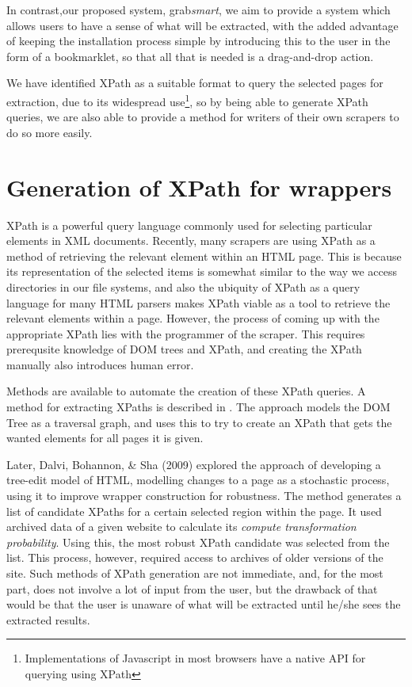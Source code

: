 In contrast,our proposed system, grab\textit{smart}, we aim to provide a system which allows users to have a
sense of what will be extracted, with the added advantage of keeping the installation process
simple by introducing this to the user in the form of a bookmarklet, so that all that is needed
is a drag-and-drop action.

We have identified XPath as a suitable format to query the selected pages for extraction,
due to its widespread use\footnote{Implementations of Javascript in most browsers have
a native API for querying using XPath}, so by being able to generate XPath queries,
we are also able to provide a method for writers of their own scrapers to do so more easily.


\section{Generation of XPath for wrappers}
XPath is a powerful query language commonly used for selecting particular elements in XML
documents. Recently, many scrapers are using XPath as a method of retrieving the relevant
element within an HTML page. This is because its representation of the selected items is
somewhat similar to the way we access directories in our file systems, and also the ubiquity of
XPath as a query language for many HTML parsers makes XPath viable as a tool to retrieve the
relevant elements within a page. However, the process of coming up with the appropriate XPath
lies with the programmer of the scraper. This requires prerequsite knowledge of DOM trees and
XPath, and creating the XPath manually also introduces human error.
	
Methods are available to automate the creation of these XPath queries. A method for extracting
XPaths is described in \cite{Anton2004}. The approach models the DOM Tree as a traversal graph,
and uses this to try to create an XPath that gets the wanted elements for all pages it is given.

Later,  Dalvi, Bohannon, \& Sha (2009) explored the approach of developing a tree-edit model of HTML,
modelling changes to a page as a stochastic process, using it to improve wrapper construction
for robustness. The method generates a list of candidate XPaths for a certain selected region
within the page. It used archived data of a given website to calculate its \textit{compute
transformation probability}. Using this, the most robust XPath candidate was selected from the
list. This process, however, required access to archives of older versions of the site. Such
methods of XPath generation are not immediate, and, for the most part, does not involve a
lot of input from the user, but the drawback of that would be that the user is unaware of what
will be extracted until he/she sees the extracted results.

